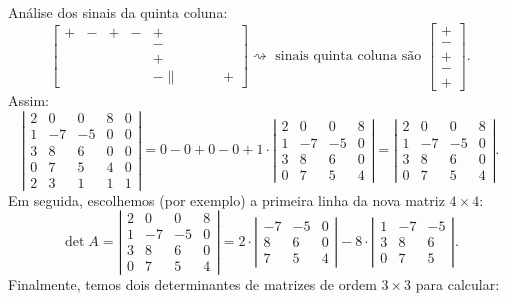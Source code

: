 \begin{ex}
Análise dos sinais da quinta coluna:
\begin{equation}
\begin{bmatrix}
+ & - & + & - & + \\
 &&&& - \\
 &&&& + \\
 &&&& - \|
 &&&& +
\end{bmatrix}\rightsquigarrow \text{ sinais quinta coluna são }
\begin{bmatrix}
+ \\ - \\ + \\ - \\ +
\end{bmatrix}.
\end{equation} Assim:
\begin{equation}
\left|
\begin{matrix}
2 & 0 & 0 & 8 & 0 \\
1 & -7 & -5 & 0 & 0 \\
3 & 8 & 6 & 0 & 0 \\
0 & 7 & 5 & 4 & 0 \\
2 & 3 & 1 & 1 & 1
\end{matrix}
\right| = 0 - 0 + 0 - 0 + 1\cdot
\left|
\begin{matrix}
2 & 0 & 0 & 8  \\
1 & -7 & -5 & 0  \\
3 & 8 & 6 & 0  \\
0 & 7 & 5 & 4
\end{matrix}
\right| =
\left|
\begin{matrix}
2 & 0 & 0 & 8  \\
1 & -7 & -5 & 0  \\
3 & 8 & 6 & 0  \\
0 & 7 & 5 & 4
\end{matrix}
\right|.
\end{equation} Em seguida, escolhemos (por exemplo) a primeira linha da nova matriz $4 \times 4$:
\begin{equation}
\det A = \left|
\begin{matrix}
2 & 0 & 0 & 8  \\
1 & -7 & -5 & 0  \\
3 & 8 & 6 & 0  \\
0 & 7 & 5 & 4
\end{matrix}
\right| = 2 \cdot\left|
\begin{matrix}
 -7 & -5 & 0  \\
 8 & 6 & 0  \\
 7 & 5 & 4
\end{matrix}
\right| - 8 \cdot
\left|
\begin{matrix}
1 & -7 & -5   \\
3 & 8 & 6   \\
0 & 7 & 5
\end{matrix}
\right|.
\end{equation} Finalmente, temos dois determinantes de matrizes de ordem $3 \times 3$ para calcular:


\end{ex}
